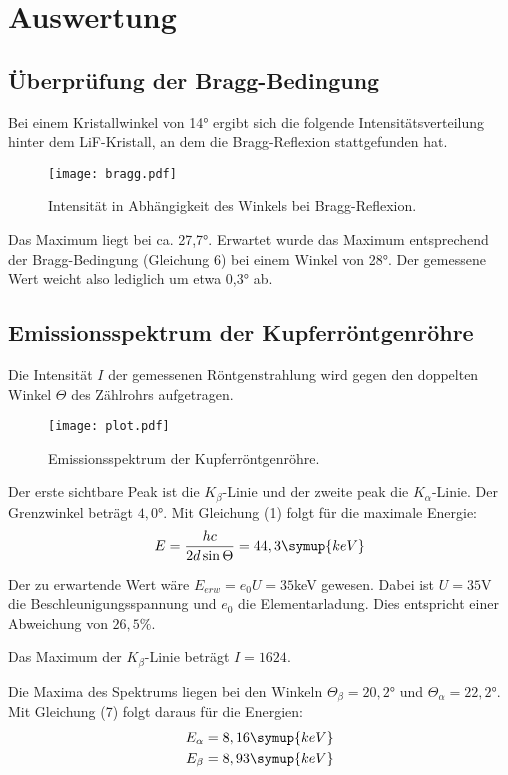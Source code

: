 \section{Auswertung}
\label{sec:Auswertung}

\subsection{Überprüfung der Bragg-Bedingung}

Bei einem Kristallwinkel von 14° ergibt sich die folgende Intensitätsverteilung
hinter dem LiF-Kristall, an dem die Bragg-Reflexion stattgefunden hat.

\begin{figure}
  \centering
  \texttt{[image: bragg.pdf]}
  \caption{Intensität in Abhängigkeit des Winkels bei Bragg-Reflexion.}
  \label{fig:bragg}
\end{figure}

Das Maximum liegt bei ca. 27,7°. Erwartet wurde das Maximum entsprechend der
Bragg-Bedingung (Gleichung 6) bei einem Winkel von 28°. Der gemessene Wert weicht
also lediglich um etwa 0,3° ab.


\subsection{Emissionsspektrum der Kupferröntgenröhre}

Die Intensität $I$ der gemessenen Röntgenstrahlung wird gegen den doppelten Winkel $\Theta$ des Zählrohrs aufgetragen.

\begin{figure}[H]
  \centering
  \texttt{[image: plot.pdf]}
  \caption{Emissionsspektrum der Kupferröntgenröhre.}
  \label{fig:plot}
\end{figure}

Der erste sichtbare Peak ist die $K_{\beta}$-Linie und der zweite peak die $K_{\alpha}$-Linie.
Der Grenzwinkel beträgt $4,0$°.
Mit Gleichung (1) folgt für die maximale Energie:
\begin{equation*}
  E = \frac{hc}{2d \sin{\Theta}} = 44,3 \symup{keV}
\end{equation*}

Der zu erwartende Wert wäre $E_{erw} = e_0 U = 35$keV gewesen. Dabei ist $U=35$V die Beschleunigungsspannung und $e_0$ die Elementarladung.
Dies entspricht einer Abweichung von $26,5 \%$.

Das Maximum der $K_{\beta}$-Linie beträgt $I=1624$.

Die Maxima des Spektrums liegen bei den Winkeln $\Theta_{\beta} = 20,2°$ und $\Theta_{\alpha} = 22,2°$.
Mit Gleichung (7) folgt daraus für die Energien:
\begin{align*}
  E_{\alpha} &= 8,16 \symup{keV} \\
  E_{\beta} &= 8,93 \symup{keV}
\end{align*}

